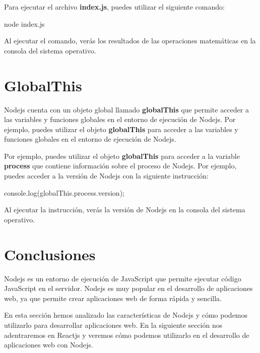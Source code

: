 \documentclass[
  a4paper,
  DIV=11,
  numbers=noendperiod,
  onepage,
  openany]{scrreprt}
\newenvironment{Shaded}{\begin{snugshade}}{\end{snugshade}}
\newcommand{\AttributeTok}[1]{\textcolor[rgb]{0.40,0.45,0.13}{#1}}
\newcommand{\BuiltInTok}[1]{\textcolor[rgb]{0.00,0.23,0.31}{#1}}
\newcommand{\ExtensionTok}[1]{\textcolor[rgb]{0.00,0.23,0.31}{#1}}
\newcommand{\FunctionTok}[1]{\textcolor[rgb]{0.28,0.35,0.67}{#1}}
\newcommand{\NormalTok}[1]{\textcolor[rgb]{0.00,0.23,0.31}{#1}}
\newcommand{\OperatorTok}[1]{\textcolor[rgb]{0.37,0.37,0.37}{#1}}
\begin{document}
\begin{tcolorbox}
Para ejecutar el archivo \textbf{index.js}, puedes utilizar el siguiente
comando:

\begin{Shaded}
\begin{Highlighting}[]
\ExtensionTok{node}\NormalTok{ index.js}
\end{Highlighting}
\end{Shaded}

Al ejecutar el comando, verás los resultados de las operaciones
matemáticas en la consola del sistema operativo.

\section{GlobalThis}\label{globalthis}

Nodejs cuenta con un objeto global llamado \textbf{globalThis} que
permite acceder a las variables y funciones globales en el entorno de
ejecución de Nodejs. Por ejemplo, puedes utilizar el objeto
\textbf{globalThis} para acceder a las variables y funciones globales en
el entorno de ejecución de Nodejs.

Por ejemplo, puedes utilizar el objeto \textbf{globalThis} para acceder
a la variable \textbf{process} que contiene información sobre el proceso
de Nodejs. Por ejemplo, puedes acceder a la versión de Nodejs con la
siguiente instrucción:

\begin{Shaded}
\begin{Highlighting}[]
\BuiltInTok{console}\OperatorTok{.}\FunctionTok{log}\NormalTok{(globalThis}\OperatorTok{.}\AttributeTok{process}\OperatorTok{.}\AttributeTok{version}\NormalTok{)}\OperatorTok{;}
\end{Highlighting}
\end{Shaded}

Al ejecutar la instrucción, verás la versión de Nodejs en la consola del
sistema operativo.

\section{Conclusiones}\label{conclusiones-1}

Nodejs es un entorno de ejecución de JavaScript que permite ejecutar
código JavaScript en el servidor. Nodejs es muy popular en el desarrollo
de aplicaciones web, ya que permite crear aplicaciones web de forma
rápida y sencilla.

En esta sección hemos analizado las características de Nodejs y cómo
podemos utilizarlo para desarrollar aplicaciones web. En la siguiente
sección nos adentraremos en Reactjs y veremos cómo podemos utilizarlo en
el desarrollo de aplicaciones web con Nodejs.


\end{tcolorbox}
\end{document}

